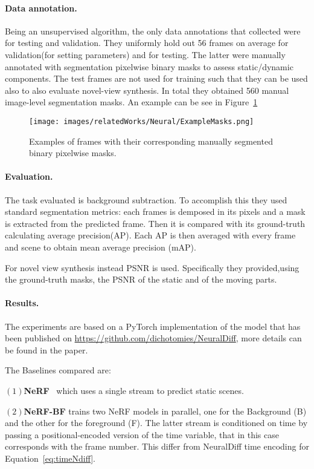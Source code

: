 \paragraph{Data annotation.}
Being an unsupervised algorithm, the only data annotations that collected were for testing and 
validation. They uniformly hold out 56 frames on average for validation(for setting parameters)
and for testing. The latter were manually annotated with segmentation pixelwise binary masks to assess static/dynamic components.
The test frames are not used for training such that they can be used also to also evaluate 
novel-view synthesis. In total they obtained 560 manual image-level segmentation masks. An example can
be see in Figure~\ref{fig:exMasks}
\begin{figure}[t]
    \centering
    \texttt{[image: images/relatedWorks/Neural/ExampleMasks.png]} 
    \caption{Examples of frames with their corresponding manually segmented binary pixelwise masks.}\label{fig:exMasks}
\end{figure}

\paragraph{Evaluation.}The task evaluated is background subtraction. To accomplish this they
used standard segmentation metrics: each frames is demposed in its pixels and a mask is 
extracted from the predicted frame. Then it is compared with its ground-truth calculating 
average precision(AP). Each AP is then averaged with every frame and scene to obtain mean 
average precision (mAP).

For novel view synthesis instead PSNR is used. Specifically they provided,using the 
ground-truth masks, the PSNR of the static and of the moving parts.\vspace{0.4cm}

\paragraph{Results.} The experiments are based on a PyTorch implementation of the model
that has been published on \url{https://github.com/dichotomies/NeuralDiff}, more details 
can be found in the paper. 

The Baselines compared are:

$(1)$\textbf{NeRF}~\cite{nerf} which uses a single stream to predict static scenes.

$(2)$\textbf{NeRF-BF} trains two NeRF models in parallel, one for the Background (B) and the
other for the foreground (F). The latter stream is conditioned on time by passing a
positional-encoded version of the time variable, that in this case corresponds with 
the frame number. This differ from NeuralDiff time encoding for Equation~\ref{eq:timeNdiff}.


